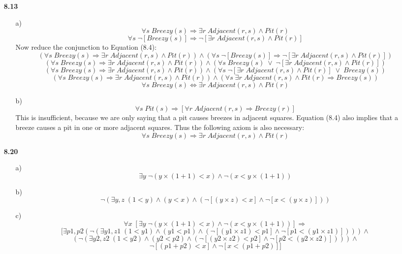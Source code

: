 \documentclass{article}
\begin{document}
\begin{enumerate}
\item[\textbf{8.13}]
\begin{enumerate}
\item[a)]
\[
\forall s \; Breezy(s) \Rightarrow \exists r \; Adjacent(r,s) \wedge Pit(r)
\]\[
\forall s \; \neg[Breezy(s)] \Rightarrow \neg[\exists r \; Adjacent(r,s) \wedge Pit(r)]
\]
Now reduce the conjunction to Equation (8.4):
\[
(\forall s \; Breezy(s) \Rightarrow \exists r \; Adjacent(r,s) \wedge Pit(r)) \wedge
(\forall s \; \neg[Breezy(s)] \Rightarrow \neg[\exists r \; Adjacent(r,s) \wedge Pit(r)])
\]
\[
(\forall s \; Breezy(s) \Rightarrow \exists r \; Adjacent(r,s) \wedge Pit(r)) \wedge
(\forall s \; Breezy(s) \; \vee \; \neg[\exists r \; Adjacent(r,s) \wedge Pit(r)])
\]
\[
(\forall s \; Breezy(s) \Rightarrow \exists r \; Adjacent(r,s) \wedge Pit(r)) \wedge
(\forall s \; \neg[\exists r \; Adjacent(r,s) \wedge Pit(r)] \; \vee \; Breezy(s))
\]
\[
(\forall s \; Breezy(s) \Rightarrow \exists r \; Adjacent(r,s) \wedge Pit(r)) \wedge
(\forall s \; \exists r \; Adjacent(r,s) \wedge Pit(r) \Rightarrow Breezy(s))
\]
\[
\forall s \; Breezy(s) \Leftrightarrow \exists r \; Adjacent(r,s) \wedge Pit(r)
\]

\item[b)]
\[
\forall s \; Pit(s) \Rightarrow [\forall r \; Adjacent(r,s) \Rightarrow Breezy(r)]
\]
This is insufficient, because we are only saying that a pit causes breezes in
adjacent squares. Equation (8.4) also implies that a breeze causes a pit in one
or more adjacent squares. Thus the following axiom is also necessary:
\[
\forall s \; Breezy(s) \Rightarrow \exists r \; Adjacent(r,s) \wedge Pit(r)
\]
\end{enumerate}

\item[\textbf{8.20}]
\begin{enumerate}
\item[a)]
\[
\exists y \; \neg(y \times (1+1) < x) \wedge \neg(x < y \times (1+1))
\]
\item[b)]
\[
\neg(\exists y,z \; (1<y) \wedge (y<x) \wedge (\neg[(y \times z) < x] \wedge \neg[x < (y \times z)]))
\]
\item[c)]
\[
\forall x \; [\exists y \; \neg(y \times (1+1) < x) \wedge \neg(x < y \times (1+1))] \Rightarrow
\]\[
[\exists p1,p2 (\neg(\exists y1,z1 \; (1<y1) \wedge (y1<p1) \wedge(\neg[(y1 \times z1) < p1] \wedge \neg[p1 < (y1 \times z1)]))) \wedge
\]\[
(\neg(\exists y2,z2 \; (1<y2) \wedge (y2<p2) \wedge (\neg[(y2 \times z2) < p2] \wedge \neg[p2 < (y2 \times z2)]))) \wedge
\]\[
\neg[(p1+p2) < x] \wedge \neg[x < (p1+p2)]]
\]
\end{enumerate}


\end{enumerate}
\end{document}
